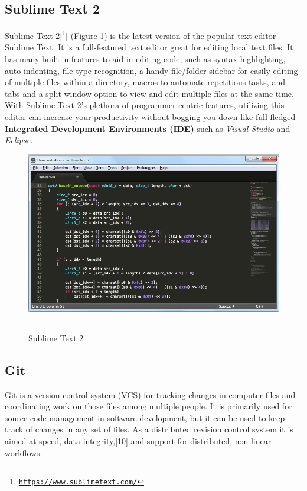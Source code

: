\subsection{Sublime Text 2}
Sublime Text 2[\footnote{\href{https://www.sublimetext.com/}{\texttt{https://www.sublimetext.com/}}}] (Figure \ref{fig:sublime}) is the latest version of the popular text editor Sublime Text. It is a full-featured text
editor great for editing local text files. It has many built-in features to aid in editing code, such as
syntax highlighting, auto-indenting, file type recognition, a handy file/folder sidebar for easily
editing of multiple files within a directory, macros to automate repetitious tasks, and tabs and a
split-window option to view and edit multiple files at the same time. With Sublime Text 2's plethora
of programmer-centric features, utilizing this editor can increase your productivity without
bogging you down like full-fledged \textbf{Integrated Development Environments (IDE)} such as \textit{Visual
	Studio} and \textit{Eclipse}. 
\begin{figure}[h!]
	\centering
	\includegraphics[width=1\textwidth]{./images/sublime.jpg}
	\rule{1\textwidth}{1pt}
	\caption{Sublime Text 2}
	\label{fig:sublime}
\end{figure}

\subsection{Git}
Git is a version control system (VCS) for tracking changes in computer files and coordinating work on those files among multiple people. It is primarily used for source code management in software development, but it can be used to keep track of changes in any set of files. As a distributed revision control system it is aimed at speed, data integrity,[10] and support for distributed, non-linear workflows.
\newline

